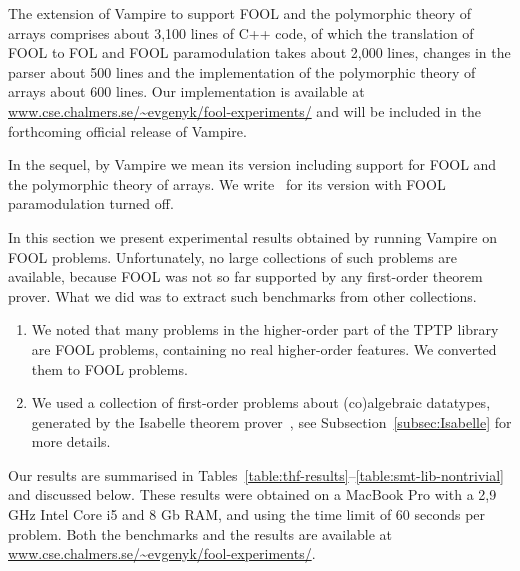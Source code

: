 The extension of Vampire to support FOOL and the polymorphic theory of
arrays comprises about 3,100 lines of C++ code, of which the
translation of FOOL to FOL and FOOL paramodulation takes about 2,000
lines, changes in the parser about 500 lines and
the implementation of the polymorphic theory of arrays about 600 lines.
Our implementation is available at \url{www.cse.chalmers.se/~evgenyk/fool-experiments/} and will be included
in the forthcoming official release of Vampire.

In the sequel, by Vampire we mean its version including support for
FOOL and the polymorphic theory of arrays. We write \nofoolVampire\ for
its version with FOOL paramodulation turned off.

In this section we present experimental results obtained by running Vampire on FOOL problems. Unfortunately, no large collections of such problems are available, because FOOL was not so far supported by any first-order theorem prover. What we did was to extract such benchmarks from other collections.

\begin{enumerate}
\item We noted that many problems in the higher-order part of the TPTP library~\cite{TPTP} are FOOL problems, containing no real higher-order features. We converted them to FOOL problems.

\item We used a collection of first-order problems about (co)al\-ge\-braic datatypes, generated by the Isabelle theorem prover~\cite{Isabelle}, see Subsection~\ref{subsec:Isabelle} for more details.
\end{enumerate}
Our results are summarised in Tables~\ref{table:thf-results}--\ref{table:smt-lib-nontrivial} and discussed below. These results were obtained on a MacBook Pro with a 2,9 GHz Intel Core i5 and 8 Gb RAM, and using the time limit of 60 seconds per problem. Both the benchmarks and the results are available at \url{www.cse.chalmers.se/~evgenyk/fool-experiments/}.

